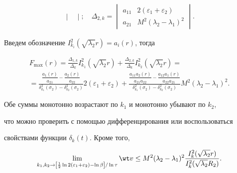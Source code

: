 \begin{pf}
\begin{gather*}
\begin{vmatrix}
\end{vmatrix} 


;\quad \Delta_{2,k}= 


\begin{vmatrix} 


a_{11} & 2(\varepsilon_1+\varepsilon_2) \\ 


a_{21} & M^2(\lambda_2-\lambda_1)^2 


\end{vmatrix} 


. 


\end{gather*} 


Введем обозначение $I^2_{k_i}(\sqrt{\lambda_2}r)=a_i(r)$, тогда 


\begin{multline*} 


F_{\max}(r)=\frac{\Delta_{1,k}}{\Delta_k} 


I^2_{k_1}(\sqrt{\lambda_2}r)+\frac{\Delta_{2,k}}{\Delta_k} 


I^2_{k_2}(\sqrt{\lambda_2}r) = \\ 


= \frac{\dfrac{a_1(r)}{a_{21}}-\dfrac{a_2(r)}{a_{22}}} 


{\delta^2_{k_1}(\sigma_2)-\delta^2_{k_2}(\sigma_2)} 


2(\varepsilon_1+\varepsilon_2)+ 


\frac{\dfrac{a_{11}a_2(r)}{a_{21}a_{22}}- 


\dfrac{a_{12}a_1(r)}{a_{22}a_{21}}} 


{\delta^2_{k_1}(\sigma_2)-\delta^2_{k_2}(\sigma_2)} 


M^2(\lambda_2-\lambda_1)^2. 


\end{multline*} 


Обе суммы монотонно возрастают по $k_1$ и монотонно убывают по $k_2$, 


что можно проверить с помощью дифференцирования или воспользоваться 


свойствами функции $\delta_k(t)$. Кроме того, 


$$ 


\lim_{k_1,k_2\to\left[\frac{1}{2}\ln2(\varepsilon_1+\varepsilon_2) 


-\ln\beta\right]/\ln\tau}\wt v\le M^2(\lambda_2-\lambda_1)^2 


\frac{I^2_k(\sqrt{\lambda_2}r)}{I^2_k(\sqrt{\lambda_2}R_2)}. 


$$ 



\end{pf}
